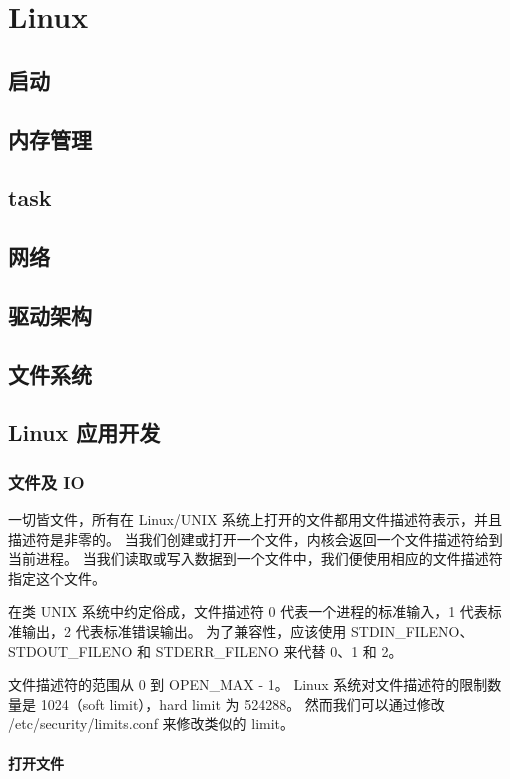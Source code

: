 \section{Linux}

\subsection{启动}
\subsection{内存管理}
\subsection{task}
\subsection{网络}
\subsection{驱动架构}
\subsection{文件系统}

\subsection{Linux 应用开发}

\subsubsection{文件及 IO}

一切皆文件，所有在 Linux/UNIX 系统上打开的文件都用文件描述符表示，并且描述符是非零的。
当我们创建或打开一个文件，内核会返回一个文件描述符给到当前进程。
当我们读取或写入数据到一个文件中，我们便使用相应的文件描述符指定这个文件。

在类 UNIX 系统中约定俗成，文件描述符 0 代表一个进程的标准输入，1 代表标准输出，2 代表标准错误输出。
为了兼容性，应该使用 STDIN\_FILENO、STDOUT\_FILENO 和 STDERR\_FILENO 来代替 0、1 和 2。

文件描述符的范围从 0 到 OPEN\_MAX - 1。
Linux 系统对文件描述符的限制数量是 1024（soft limit），hard limit 为 524288。
然而我们可以通过修改 /etc/security/limits.conf 来修改类似的 limit。

\paragraph{打开文件}

